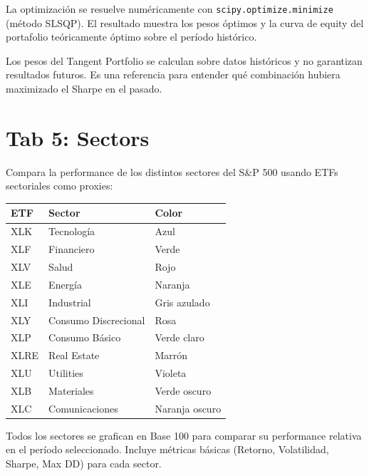 \documentclass[11pt, a4paper]{article}
\newcommand{\code}[1]{\texttt{#1}}
\begin{document}
La optimización se resuelve numéricamente con \code{scipy.optimize.minimize} (método SLSQP). El resultado muestra los pesos óptimos y la curva de equity del portafolio teóricamente óptimo sobre el período histórico.

\begin{infobox}
  Los pesos del Tangent Portfolio se calculan sobre datos históricos y no garantizan resultados futuros. Es una referencia para entender qué combinación hubiera maximizado el Sharpe en el pasado.
\end{infobox}

\newpage

\section{Tab 5: Sectors}

Compara la performance de los distintos sectores del S\&P 500 usando ETFs sectoriales como proxies:

\begin{center}
\begin{tabular}{lll}
  \toprule
  \textbf{ETF} & \textbf{Sector} & \textbf{Color} \\
  \midrule
  XLK  & Tecnología               & Azul \\
  XLF  & Financiero               & Verde \\
  XLV  & Salud                    & Rojo \\
  XLE  & Energía                  & Naranja \\
  XLI  & Industrial               & Gris azulado \\
  XLY  & Consumo Discrecional     & Rosa \\
  XLP  & Consumo Básico           & Verde claro \\
  XLRE & Real Estate              & Marrón \\
  XLU  & Utilities                & Violeta \\
  XLB  & Materiales               & Verde oscuro \\
  XLC  & Comunicaciones           & Naranja oscuro \\
  \bottomrule
\end{tabular}
\end{center}

Todos los sectores se grafican en Base 100 para comparar su performance relativa en el período seleccionado. Incluye métricas básicas (Retorno, Volatilidad, Sharpe, Max DD) para cada sector.
\end{document}
